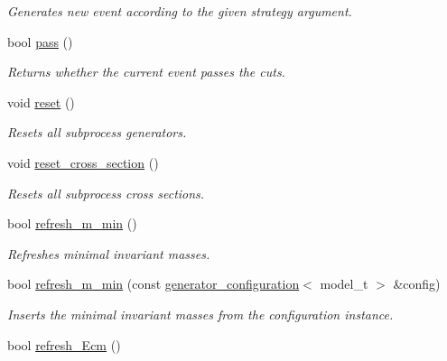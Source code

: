 \begin{DoxyCompactItemize}
\begin{DoxyCompactList}\small\item\em Generates new event according to the given strategy argument. \end{DoxyCompactList}\item 
\hypertarget{a00212_a0d3e8d948540d57655b7d310cb70d8ba}{}bool \hyperlink{a00212_a0d3e8d948540d57655b7d310cb70d8ba}{pass} ()\label{a00212_a0d3e8d948540d57655b7d310cb70d8ba}

\begin{DoxyCompactList}\small\item\em Returns whether the current event passes the cuts. \end{DoxyCompactList}\item 
\hypertarget{a00212_a513578e30af093a93581b3cd3667786f}{}void \hyperlink{a00212_a513578e30af093a93581b3cd3667786f}{reset} ()\label{a00212_a513578e30af093a93581b3cd3667786f}

\begin{DoxyCompactList}\small\item\em Resets all subprocess generators. \end{DoxyCompactList}\item 
\hypertarget{a00212_ac012b825829f4a734f7667bb8c6b0bb8}{}void \hyperlink{a00212_ac012b825829f4a734f7667bb8c6b0bb8}{reset\+\_\+cross\+\_\+section} ()\label{a00212_ac012b825829f4a734f7667bb8c6b0bb8}

\begin{DoxyCompactList}\small\item\em Resets all subprocess cross sections. \end{DoxyCompactList}\item 
\hypertarget{a00212_a786206c05113819b08b67459225152af}{}bool \hyperlink{a00212_a786206c05113819b08b67459225152af}{refresh\+\_\+m\+\_\+min} ()\label{a00212_a786206c05113819b08b67459225152af}

\begin{DoxyCompactList}\small\item\em Refreshes minimal invariant masses. \end{DoxyCompactList}\item 
bool \hyperlink{a00212_abab5dcad611c677ee640a82a0f4020c8}{refresh\+\_\+m\+\_\+min} (const \hyperlink{a00241}{generator\+\_\+configuration}$<$ model\+\_\+t $>$ \&config)
\begin{DoxyCompactList}\small\item\em Inserts the minimal invariant masses from the configuration instance. \end{DoxyCompactList}\item 
\hypertarget{a00212_a8bf0d938af278477e00b096ece4a9af1}{}bool \hyperlink{a00212_a8bf0d938af278477e00b096ece4a9af1}{refresh\+\_\+\+Ecm} ()\label{a00212_a8bf0d938af278477e00b096ece4a9af1}


\end{DoxyCompactItemize}
